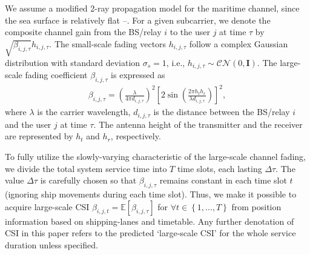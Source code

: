 \documentclass[conference]{IEEEtran}
\begin{document}
 We assume a modified 2-ray propagation model for the maritime channel, since the sea surface is relatively flat \cite{p0}--\cite{p2}. For a given subcarrier, we denote the composite channel gain from the BS/relay $i$ to the user $j$ at time $\tau $ by $\sqrt {{\beta _{i,j,\tau }}} {h_{i,j,\tau }}$. The small-scale fading vectors ${h_{i,j,\tau }}$ follow a complex Gaussian distribution with standard deviation ${\sigma _s} = 1$, i.e., ${h_{i,j,\tau }} \sim \mathcal{CN}(0, \mathbf{I})$. The large-scale fading coefficient ${\beta _{i,j,\tau }}$ is expressed as
 \begin{align}
 {\beta _{i,j,\tau }} = {\left( {\frac{\lambda }{{4\pi {d_{i,j,\tau }}}}} \right)^2}{\left[ {2\sin \left( {\frac{{2\pi {h_t}{h_r}}}{{\lambda {d_{i,j,\tau }}}}} \right)} \right]^2} ,
 \end{align}
 where $\lambda $ is the carrier wavelength, ${d_{i,j,\tau }}$ is the distance between the BS/relay $i$ and the user $j$ at time $\tau $. The antenna height of the transmitter and the receiver are represented by $h_t$ and $h_r$, respectively. 
 
 To fully utilize the slowly-varying characteristic of the large-scale channel fading, we divide the total system service time into $T$ time slots, each lasting $\Delta \tau$. The value $\Delta \tau$ is carefully chosen so that $\beta _{i,j,\tau }$ remains constant in each time slot $t$ (ignoring ship movements during each time slot). Thus, we make it possible to acquire large-scale CSI $\beta _{i,j,t} = \mathbb{E} \left [ {\beta _{i,j,\tau }} \right ]$ for $\forall t \in \left\{ {1,...,T} \right\}$ from position information based on shipping-lanes and timetable. Any further denotation of CSI in this paper refers to the predicted `large-scale CSI' for the whole service duration unless specified. 
\end{document}
